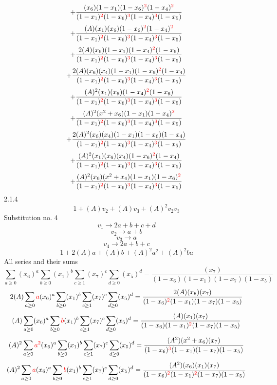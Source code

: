 \documentclass{article}
\begin{document}
\[+\frac{(x_6)(1-x_1)(1-x_6)^{\textcolor{red}{2}}(1-x_4)^{\textcolor{red}{2}}}{(1-x_1)^{\textcolor{red}{2}}(1-x_6)^{\textcolor{red}{3}}(1-x_4)^{\textcolor{red}{3}}(1-x_5)}\]\[+\frac{(A)(x_1)(x_6)(1-x_6)^{\textcolor{red}{2}}(1-x_4)^{\textcolor{red}{2}}}{(1-x_1)^{\textcolor{red}{2}}(1-x_6)^{\textcolor{red}{3}}(1-x_4)^{\textcolor{red}{3}}(1-x_5)}\]\[+\frac{2(A)(x_6)(1-x_1)(1-x_4)^{\textcolor{red}{2}}(1-x_6)}{(1-x_1)^{\textcolor{red}{2}}(1-x_6)^{\textcolor{red}{3}}(1-x_4)^{\textcolor{red}{3}}(1-x_5)}\]\[+\frac{2(A)(x_6)(x_4)(1-x_1)(1-x_6)^{\textcolor{red}{2}}(1-x_4)}{(1-x_1)^{\textcolor{red}{2}}(1-x_6)^{\textcolor{red}{3}}(1-x_4)^{\textcolor{red}{3}}(1-x_5)}\]\[+\frac{(A)^{2}(x_1)(x_6)(1-x_4)^{\textcolor{red}{2}}(1-x_6)}{(1-x_1)^{\textcolor{red}{2}}(1-x_6)^{\textcolor{red}{3}}(1-x_4)^{\textcolor{red}{3}}(1-x_5)}\]\[+\frac{(A)^{2}(x^{2}+x_6)(1-x_1)(1-x_4)^{\textcolor{red}{2}}}{(1-x_1)^{\textcolor{red}{2}}(1-x_6)^{\textcolor{red}{3}}(1-x_4)^{\textcolor{red}{3}}(1-x_5)}\]\[+\frac{2(A)^{2}(x_6)(x_4)(1-x_1)(1-x_6)(1-x_4)}{(1-x_1)^{\textcolor{red}{2}}(1-x_6)^{\textcolor{red}{3}}(1-x_4)^{\textcolor{red}{3}}(1-x_5)}\]\[+\frac{(A)^{2}(x_1)(x_6)(x_4)(1-x_6)^{\textcolor{red}{2}}(1-x_4)}{(1-x_1)^{\textcolor{red}{2}}(1-x_6)^{\textcolor{red}{3}}(1-x_4)^{\textcolor{red}{3}}(1-x_5)}\]\[+\frac{(A)^{2}(x_6)(x^{2}+x_4)(1-x_1)(1-x_6)^{\textcolor{red}{2}}}{(1-x_1)^{\textcolor{red}{2}}(1-x_6)^{\textcolor{red}{3}}(1-x_4)^{\textcolor{red}{3}}(1-x_5)}\]
2.1.4
\[1+(A)v_2+(A)v_3+(A)^2v_2v_3\]Substitution no. 4\[v_1\rightarrow{2a+b+c+d}\]\[v_2\rightarrow{a+b}\]\[v_3\rightarrow{a}\]\[v_4\rightarrow{2a+b+c}\]\[1+2(A)a+(A)b+(A)^2a^{2}+(A)^2ba\]All series and their sums\[\sum_{a\geq{0}}(x_6)^{a}\sum_{b\geq{0}}(x_1)^{b}\sum_{c\geq{1}}(x_7)^{c}\sum_{d\geq{0}}(x_5)^{d}=\frac{(x_7)}{(1-x_6)(1-x_1)(1-x_7)(1-x_5)}\]\[2(A)\sum_{a\geq{0}}\textcolor{red}{a}(x_6)^{a}\sum_{b\geq{0}}(x_1)^{b}\sum_{c\geq{1}}(x_7)^{c}\sum_{d\geq{0}}(x_5)^{d}=\frac{2(A)(x_6)(x_7)}{(1-x_6)^{\textcolor{red}{2}}(1-x_1)(1-x_7)(1-x_5)}\]\[(A)\sum_{a\geq{0}}(x_6)^{a}\sum_{b\geq{0}}\textcolor{red}{b}(x_1)^{b}\sum_{c\geq{1}}(x_7)^{c}\sum_{d\geq{0}}(x_5)^{d}=\frac{(A)(x_1)(x_7)}{(1-x_6)(1-x_1)^{\textcolor{red}{2}}(1-x_7)(1-x_5)}\]\[(A)^{2}\sum_{a\geq{0}}\textcolor{red}{a^{2}}(x_6)^{a}\sum_{b\geq{0}}(x_1)^{b}\sum_{c\geq{1}}(x_7)^{c}\sum_{d\geq{0}}(x_5)^{d}=\frac{(A^{2})(x^{2}+x_6)(x_7)}{(1-x_6)^{\textcolor{red}{3}}(1-x_1)(1-x_7)(1-x_5)}\]\[(A)^{2}\sum_{a\geq{0}}\textcolor{red}{a}(x_6)^{a}\sum_{b\geq{0}}\textcolor{red}{b}(x_1)^{b}\sum_{c\geq{1}}(x_7)^{c}\sum_{d\geq{0}}(x_5)^{d}=\frac{(A^{2})(x_6)(x_1)(x_7)}{(1-x_6)^{\textcolor{red}{2}}(1-x_1)^{\textcolor{red}{2}}(1-x_7)(1-x_5)}\]
\end{document}
